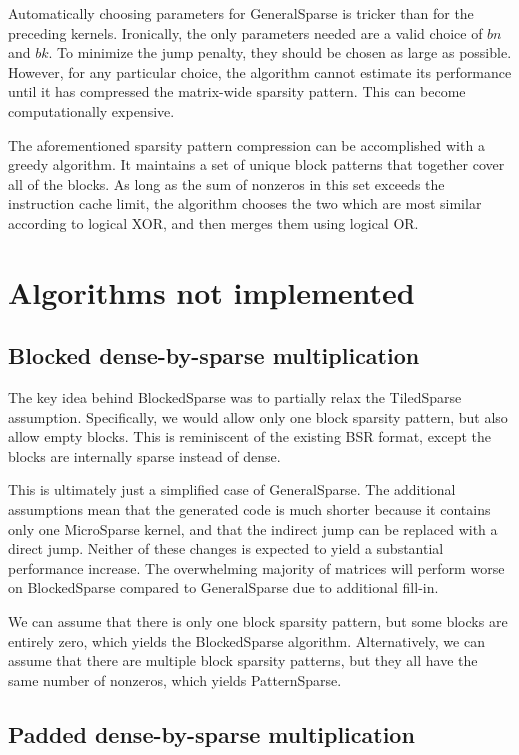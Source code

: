 Automatically choosing parameters for GeneralSparse is tricker than for the preceding kernels. Ironically, the only parameters needed are a valid choice of $bn$ and $bk$. To minimize the jump penalty, they should be chosen as large as possible. However, for any particular choice, the algorithm cannot estimate its performance until it has compressed the matrix-wide sparsity pattern. This can become computationally expensive.

The aforementioned sparsity pattern compression can be accomplished with a greedy algorithm. It maintains a set of unique block patterns that together cover all of the blocks. As long as the sum of nonzeros in this set exceeds the instruction cache limit, the algorithm chooses the two which are most similar according to logical XOR, and then merges them using logical OR.



\section{Algorithms not implemented}

\subsection{Blocked dense-by-sparse multiplication}

  The key idea behind BlockedSparse was to partially relax the TiledSparse assumption. Specifically, we would allow only one block sparsity pattern, but also allow empty blocks. This is reminiscent of the existing BSR format, except the blocks are internally sparse instead of dense. 

  This is ultimately just a simplified case of GeneralSparse. The additional assumptions mean that the generated code is much shorter because it contains only one MicroSparse kernel, and that the indirect jump can be replaced with a direct jump. Neither of these changes is expected to yield a substantial performance increase. The overwhelming majority of matrices will perform worse on BlockedSparse compared to GeneralSparse due to additional fill-in.

  We can assume that there is only one block sparsity pattern, but some blocks are entirely zero, which yields the BlockedSparse algorithm. Alternatively, we can assume that there are multiple block sparsity patterns, but they all have the same number of nonzeros, which yields PatternSparse.


\subsection{Padded dense-by-sparse multiplication}


